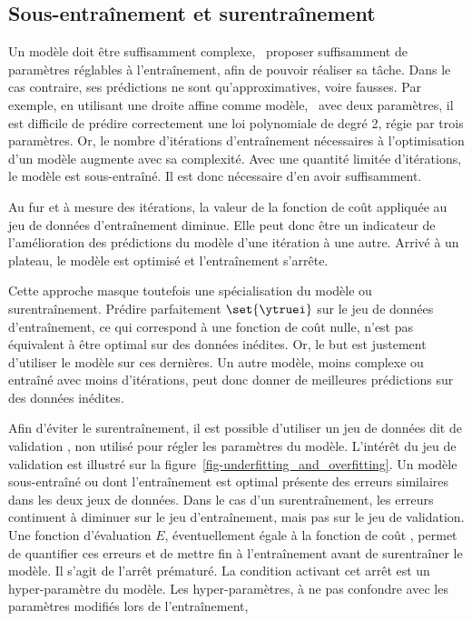 \subsection{Sous-entraînement et surentraînement}
Un modèle doit être suffisamment complexe,
\ie\ proposer suffisamment de paramètres réglables à l'entraînement,
afin de pouvoir réaliser sa tâche.
Dans le cas contraire, ses prédictions ne sont qu'approximatives, voire fausses.
Par exemple,
en utilisant une droite affine comme modèle, \ie\ avec deux paramètres,
il est difficile de prédire correctement
une loi polynomiale de degré 2, régie par trois paramètres.
Or, le nombre d'itérations d'entraînement nécessaires à l'optimisation d'un modèle augmente avec sa complexité.
Avec une quantité limitée d'itérations, le modèle est sous-entraîné.
Il est donc nécessaire d'en avoir suffisamment.
\par
Au fur et à mesure des itérations,
la valeur de la fonction de coût appliquée au jeu de données d'entraînement diminue.
Elle peut donc être un indicateur de l'amélioration des prédictions du modèle d'une itération à une autre.
Arrivé à un plateau, le modèle est optimisé et l'entraînement s'arrête.
\par
Cette approche masque toutefois une spécialisation du modèle ou surentraînement.
Prédire parfaitement $\set{\ytruei}$ sur le jeu de données d'entraînement,
ce qui correspond à une fonction de coût nulle,
n'est pas équivalent à être optimal sur des données inédites.
Or, le but est justement d'utiliser le modèle sur ces dernières.
Un autre modèle, moins complexe ou entraîné avec moins d'itérations,
peut donc donner de meilleures prédictions sur des données inédites.
\par
Afin d'éviter le surentraînement,
il est possible d'utiliser un jeu de données dit de \og validation \fg,
non utilisé pour régler les paramètres du modèle.
L'intérêt du jeu de validation est illustré sur la figure~\ref{fig-underfitting_and_overfitting}.
Un modèle sous-entraîné ou dont l'entraînement est optimal présente des erreurs similaires dans les deux jeux de données.
Dans le cas d'un surentraînement, les erreurs continuent à diminuer sur le jeu d'entraînement, mais pas sur le jeu de validation.
Une fonction d'évaluation $E$, éventuellement égale à la fonction de coût \Loss, permet de quantifier ces erreurs et de mettre fin à l'entraînement avant de surentraîner le modèle.
Il s'agit de l'arrêt prématuré.
La condition activant cet arrêt est un \og hyper-paramètre \fg{} du modèle.
Les hyper-paramètres,
à ne pas confondre avec les paramètres modifiés lors de l'entraînement,
